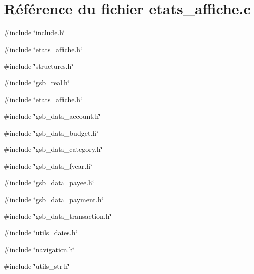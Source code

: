 \section{Référence du fichier etats\_\-affiche.c}
\label{etats__affiche_8c}
{\ttfamily \#include \char`\"{}include.h\char`\"{}}\par
{\ttfamily \#include \char`\"{}etats\_\-affiche.h\char`\"{}}\par
{\ttfamily \#include \char`\"{}structures.h\char`\"{}}\par
{\ttfamily \#include \char`\"{}gsb\_\-real.h\char`\"{}}\par
{\ttfamily \#include \char`\"{}etats\_\-affiche.h\char`\"{}}\par
{\ttfamily \#include \char`\"{}gsb\_\-data\_\-account.h\char`\"{}}\par
{\ttfamily \#include \char`\"{}gsb\_\-data\_\-budget.h\char`\"{}}\par
{\ttfamily \#include \char`\"{}gsb\_\-data\_\-category.h\char`\"{}}\par
{\ttfamily \#include \char`\"{}gsb\_\-data\_\-fyear.h\char`\"{}}\par
{\ttfamily \#include \char`\"{}gsb\_\-data\_\-payee.h\char`\"{}}\par
{\ttfamily \#include \char`\"{}gsb\_\-data\_\-payment.h\char`\"{}}\par
{\ttfamily \#include \char`\"{}gsb\_\-data\_\-transaction.h\char`\"{}}\par
{\ttfamily \#include \char`\"{}utils\_\-dates.h\char`\"{}}\par
{\ttfamily \#include \char`\"{}navigation.h\char`\"{}}\par
{\ttfamily \#include \char`\"{}utils\_\-str.h\char`\"{}}\par
